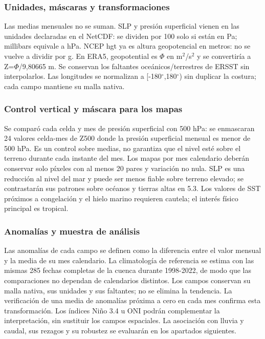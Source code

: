 \subsubsection*{Unidades, máscaras y transformaciones}
Las medias mensuales no se suman. SLP y presión superficial vienen en las unidades declaradas en el NetCDF: se dividen por 100 solo si están en Pa; millibars equivale a hPa. NCEP hgt ya es altura geopotencial en metros: no se vuelve a dividir por g. En ERA5, geopotential es $\Phi$ en m$^2$/s$^2$ y se convertiría a Z=$\Phi$/9,80665 m. Se conservan los faltantes oceánicos/terrestres de ERSST sin interpolarlos. Las longitudes se normalizan a [-180$^\circ$,180$^\circ$) sin duplicar la costura; cada campo mantiene su malla nativa.

\subsubsection*{Control vertical y máscara para los mapas}
Se comparó cada celda y mes de presión superficial con 500 hPa: se enmascaran 24 valores celda-mes de Z500 donde la presión superficial mensual es menor de 500 hPa. Es un control sobre medias, no garantiza que el nivel esté sobre el terreno durante cada instante del mes. Los mapas por mes calendario deberán conservar solo píxeles con al menos 20 pares y variación no nula. SLP es una reducción al nivel del mar y puede ser menos fiable sobre terreno elevado; se contrastarán sus patrones sobre océanos y tierras altas en 5.3. Los valores de SST próximos a congelación y el hielo marino requieren cautela; el interés físico principal es tropical.

\subsubsection*{Anomalías y muestra de análisis}
Las anomalías de cada campo se definen como la diferencia entre el valor mensual y la media de su mes calendario. La climatología de referencia se estima con las mismas 285 fechas completas de la cuenca durante 1998-2022, de modo que las comparaciones no dependan de calendarios distintos. Los campos conservan su malla nativa, sus unidades y sus faltantes; no se elimina la tendencia. La verificación de una media de anomalías próxima a cero en cada mes confirma esta transformación. Los índices Niño 3.4 u ONI podrán complementar la interpretación, sin sustituir los campos espaciales. La asociación con lluvia y caudal, sus rezagos y su robustez se evaluarán en los apartados siguientes.

